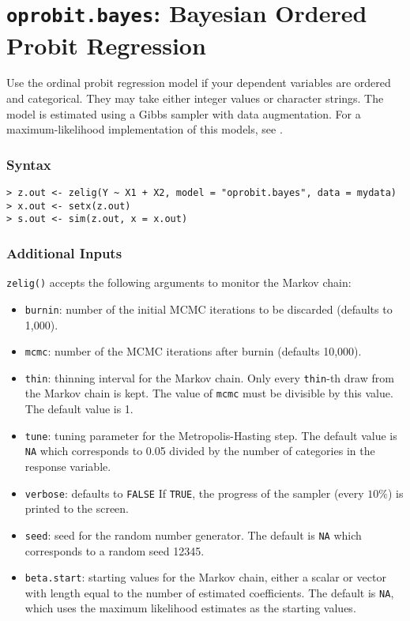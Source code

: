 \section{\texttt{oprobit.bayes}: Bayesian Ordered Probit Regression}

\label{oprobit.bayes}

Use the ordinal probit regression model if your dependent variables are ordered and 
categorical.  They may take either integer values or character strings.  The model 
is estimated using a Gibbs sampler with data augmentation.  For a 
maximum-likelihood implementation of this models, see .

\subsubsection{Syntax}
\begin{verbatim}
> z.out <- zelig(Y ~ X1 + X2, model = "oprobit.bayes", data = mydata)
> x.out <- setx(z.out)
> s.out <- sim(z.out, x = x.out)
\end{verbatim}


\subsubsection{Additional Inputs}

{\tt zelig()} accepts the following arguments to monitor the Markov
chain:  
\begin{itemize}
\item \texttt{burnin}: number of the initial MCMC iterations to be 
 discarded (defaults to 1,000).

\item \texttt{mcmc}: number of the MCMC iterations after burnin
(defaults 10,000).

\item \texttt{thin}: thinning interval for the Markov chain. Only every 
 \texttt{thin}-th draw from the Markov chain is kept. The value of
\texttt{mcmc} must be divisible by this value. The default value is 1.

\item{\texttt{tune}}: tuning parameter for the Metropolis-Hasting step.
The default value is \texttt{NA} which corresponds to 0.05 divided by
the number of categories in the response variable.

\item \texttt{verbose}: defaults to {\tt FALSE}  If \texttt{TRUE},
the progress of the sampler (every $10\%$) is printed to the screen.

\item \texttt{seed}: seed for the random number generator. The default 
is \texttt{NA} which corresponds to a random seed 12345.

\item \texttt{beta.start}: starting values for the Markov 
chain, either a scalar or vector with length equal to the number 
of estimated coefficients. The default is \texttt{NA}, which uses the
maximum likelihood estimates as the starting values.  

\end{itemize}

